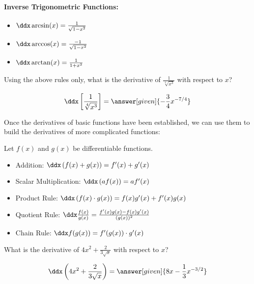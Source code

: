\documentclass[nooutcomes]{ximera}
\begin{document}
\begin{theorem}
\paragraph{Inverse Trigonometric Functions:}
\begin{itemize}
\item $\ddx \arcsin(x) = \frac{1}{\sqrt{1-x^2}}$
\item $\ddx \arccos(x) = \frac{-1}{\sqrt{1-x^2}}$
\item $\ddx \arctan(x) =\frac{1}{1+x^2}$
\end{itemize}
\end{theorem}


\begin{question} 
  Using the above rules only, what is the derivative of $\frac{1}{\sqrt[4]{x^3}}$ with respect to $x$?
  \begin{prompt} 
    \[
    \ddx \left[\frac{1}{\sqrt[4]{x^3}}\right] = \answer[given]{- \frac{3}{4} x^{-7/4}}
    \]
  \end{prompt}
\end{question}


Once the derivatives of basic functions have been established, we can use them to build the derivatives of more complicated functions:


\begin{theorem}
  Let $f(x)$ and $g(x)$ be differentiable functions.
\begin{itemize}
\item Addition: $\ddx \left( f(x) + g(x) \right) = f'(x) + g'(x)$
\item Scalar Multiplication: $\ddx \left( af(x) \right) = a f'(x)$
\item Product Rule: $\ddx \left( f(x) \cdot g(x) \right) = f(x)g'(x) + f'(x)g(x)$
\item Quotient Rule: $\ddx \frac{f(x)}{g(x)} = \frac{f'(x)g(x) - f(x)g'(x)}{(g(x))^2}$
\item Chain Rule: $\ddx f(g(x)) = f'(g(x)) \cdot g'(x)$
\end{itemize}
\end{theorem}

\begin{question} 
  What is the derivative of $4x^2 +\frac{2}{3\sqrt{x}} $ with respect to $x$?
  \begin{prompt} 
    \[
    \ddx \left(4x^2 +\frac{2}{3\sqrt{x}} \right) = \answer[given]{8x -\frac{1}{3} x^{-3/2}}
    \]
  \end{prompt}
\end{question}
\end{document}
